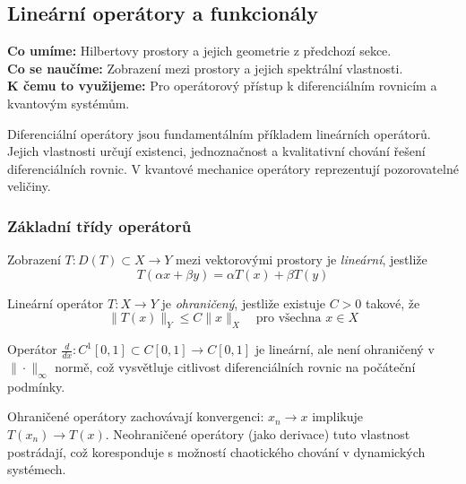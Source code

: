 \spc

\subsection{Lineární operátory a funkcionály}

\begin{scaffold}
\textbf{Co umíme:} Hilbertovy prostory a jejich geometrie z předchozí sekce. \\
\textbf{Co se naučíme:} Zobrazení mezi prostory a jejich spektrální vlastnosti. \\
\textbf{K čemu to využijeme:} Pro operátorový přístup k diferenciálním rovnicím a kvantovým systémům.
\end{scaffold}

\begin{motivation}
Diferenciální operátory jsou fundamentálním příkladem lineárních operátorů. Jejich vlastnosti určují existenci, jednoznačnost a kvalitativní chování řešení diferenciálních rovnic. V kvantové mechanice operátory reprezentují pozorovatelné veličiny.
\end{motivation}

\subsubsection{Základní třídy operátorů}

\begin{definition}
Zobrazení $T: D(T) \subset X \to Y$ mezi vektorovými prostory je \emph{lineární}, jestliže
\[
T(\alpha x + \beta y) = \alpha T(x) + \beta T(y)
\]
\end{definition}

\begin{definition}
Lineární operátor $T: X \to Y$ je \emph{ohraničený}, jestliže existuje $C > 0$ takové, že
\[
\|T(x)\|_Y \leq C \|x\|_X \quad \text{pro všechna } x \in X
\]
\end{definition}

\begin{example}
Operátor $\frac{d}{dx}: C^1[0,1] \subset C[0,1] \to C[0,1]$ je lineární, ale není ohraničený v $\|\cdot\|_\infty$ normě, což vysvětluje citlivost diferenciálních rovnic na počáteční podmínky.
\end{example}

\begin{intuition}
Ohraničené operátory zachovávají konvergenci: $x_n \to x$ implikuje $T(x_n) \to T(x)$. Neohraničené operátory (jako derivace) tuto vlastnost postrádají, což koresponduje s možností chaotického chování v dynamických systémech.
\end{intuition}

